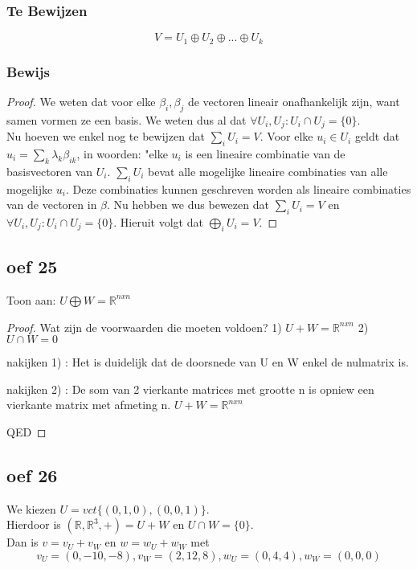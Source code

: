 \documentclass[lineaire_algebra_oplossingen.tex]{subfiles}
\begin{document}
\subsubsection*{Te Bewijzen}
\[
V = U_1 \oplus U_2 \oplus ... \oplus U_k
\]
\subsubsection*{Bewijs}
\begin{proof}
We weten dat voor elke $\beta_i,\beta_j$ de vectoren lineair onafhankelijk zijn, want samen vormen ze een basis. We weten dus al dat $\forall U_i,U_j: U_i \cap U_j = \{0\}$.\\
Nu hoeven we enkel nog te bewijzen dat $\sum_i U_i=V$. Voor elke $u_i \in U_i$ geldt dat $u_i = \sum_k\lambda_k\beta_{ik}$, in woorden: "elke $u_i$ is een lineaire combinatie van de basisvectoren van $U_i$. $\sum_i U_i$ bevat alle mogelijke lineaire combinaties van alle mogelijke $u_i$. Deze combinaties kunnen geschreven worden als lineaire combinaties van de vectoren in $\beta$. Nu hebben we dus bewezen dat $\sum_i U_i=V$ en $\forall U_i,U_j: U_i \cap U_j = \{0\}$. Hieruit volgt dat $\bigoplus_iU_i=V$.
\end{proof}



\subsection{oef 25}
Toon aan:
$ U \bigoplus W = \mathbb{R}^{n x n}$

\begin{proof}
Wat zijn de voorwaarden die moeten voldoen?
1) $ U + W = \mathbb{R}^{n x n}$
2) $ U \cap W = {0}$

nakijken 1) :
Het is duidelijk dat de doorsnede van U en W enkel de nulmatrix is.

nakijken 2) : 
De som van 2 vierkante matrices met grootte n is opniew een vierkante matrix met afmeting n. $U + W = \mathbb{R}^{n x n}$

QED

\end{proof}

\subsection*{oef 26}
We kiezen $U = vct\{(0,1,0), (0,0,1)\}$.\\ Hierdoor is $(\mathbb{R}, \mathbb{R}^3, +) = U + W$ en $U \cap W = \{0\}$.\\
Dan is $v = v_U + v_W$ en $w = w_U + w_W$ met
\[
v_U = (0,-10,-8), 
v_W = (2,12,8), 
w_U = (0,4,4), 
w_W = (0,0,0)
\]
\end{document}
